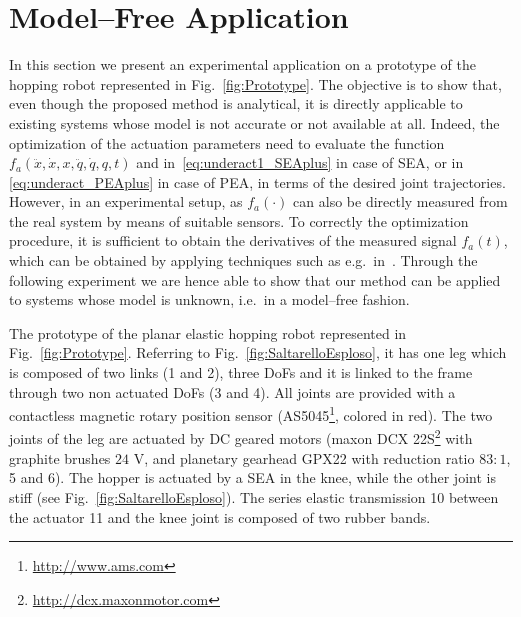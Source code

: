 \section{Model--Free Application}

In this section we present an experimental application on a prototype of the hopping robot represented in Fig.~\ref{fig:Prototype}. The objective is to show that, even though the proposed method is analytical, it is directly applicable to existing systems whose model is not accurate or not available at all. Indeed, the optimization of the actuation parameters need to evaluate the function $f_a(\ddot x, \dot x, x, \ddot{q}, \dot{q}, q, t)$ and in~\eqref{eq:underact1_SEAplus} in case of SEA, or in \eqref{eq:underact_PEAplus} in case of PEA, in terms of the desired joint trajectories. However, in an experimental setup, as $f_a(\cdot)$ can also be directly measured from the real system by means of suitable sensors.  
To correctly the optimization procedure, it is sufficient to obtain the derivatives of the measured signal $f_a(t)$, which can be obtained by applying techniques such as e.g.~in~\cite{Fliess2003}.
Through the following experiment we are hence able to show that our method can be applied to systems whose model is unknown, i.e.~in a model--free fashion. 


The prototype of the planar elastic hopping robot represented in Fig.~\ref{fig:Prototype}. Referring to Fig.~\ref{fig:SaltarelloEsploso}, it has one leg which is composed of two links (1 and 2), three DoFs and it is linked to the frame through two non actuated DoFs  (3 and 4). All joints are provided with a contactless magnetic rotary position sensor (AS5045\footnote{\url{http://www.ams.com}}, colored in red). The two joints of the leg are actuated by DC geared motors (maxon DCX 22S\footnote{\url{http://dcx.maxonmotor.com}} with graphite brushes $24$ V, and planetary gearhead GPX22 with reduction ratio $83:1$, 5 and 6). The hopper is actuated by a SEA in the knee, while the other joint is stiff (see Fig.~\ref{fig:SaltarelloEsploso}).
The series elastic transmission 10 between the actuator 11 and the knee joint is composed of two rubber bands. 

